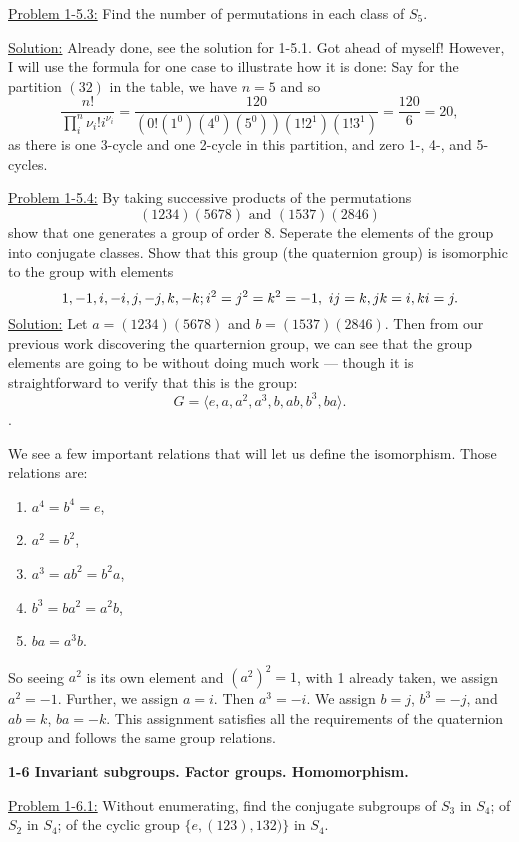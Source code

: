 \documentclass[12pt]{article}
\begin{document}
\underline{Problem 1-5.3:} Find the number of permutations in each class of
$S_5$.

\underline{Solution:} Already done, see the solution for 1-5.1. Got ahead of
myself! However, I will use the formula for one case to illustrate how it is
done: Say for the partition $(32)$ in the table, we have $n=5$ and so
\[
    \frac{n!}{\prod_i^n \nu_i! i^{\nu_i}} = \frac{120}{(0!(1^0)(4^0)(5^0))
    (1!2^1)(1!3^1)} = \frac{120}{6} = 20,
\]
as there is one 3-cycle and one 2-cycle in this partition, and zero 1-, 4-, and
5-cycles.

\underline{Problem 1-5.4:} By taking successive products of the permutations 
\[
    (1234)(5678) \text{      and       } (1537)(2846)
\]
show that one generates a group of order 8. Seperate the elements of the
group into conjugate classes. Show that this group (the quaternion group) is
isomorphic to the group with elements
\[
1, -1, i, -i, j, -j, k, -k; \\
i^2 = j^2 = k^2 = -1, \text{  } ij = k, jk = i, ki = j.
\]
\underline{Solution:} Let $a = (1234)(5678)$ and $b = (1537)(2846)$. Then from
our previous work discovering the quarternion group, we can see that the group
elements are going to be without doing much work --- though it is
straightforward to verify that this is the group:
\[
G = \langle e, a, a^2, a^3, b, ab, b^3, ba \rangle.
\].

We see a few important relations that will let us define the isomorphism. Those
relations are:
\begin{enumerate}
    \item $a^4 = b^4 = e$,
    \item $a^2 = b^2$,
    \item $a^3 =ab^2 = b^2a$,
    \item $b^3 =ba^2 = a^2b$,
    \item $ba = a^3b$.
\end{enumerate}

So seeing $a^2$ is its own element and $(a^2)^2 = 1$, with 1 already taken, we
assign $a^2 = -1$. Further, we assign $a = i$. Then $a^3 = -i$. We assign
$b = j$, $b^3 = -j$, and $ab = k$, $ba = -k$. This assignment satisfies all the
requirements of the quaternion group and follows the same group relations.

\newpage

\textbf{1-6 Invariant subgroups. Factor groups. Homomorphism.}

\underline{Problem 1-6.1:} Without enumerating, find the conjugate subgroups of
$S_3$ in $S_4$; of $S_2$ in $S_4$; of the cyclic group $\{e , (123), 132) \}$
in $S_4$. 
\end{document}
